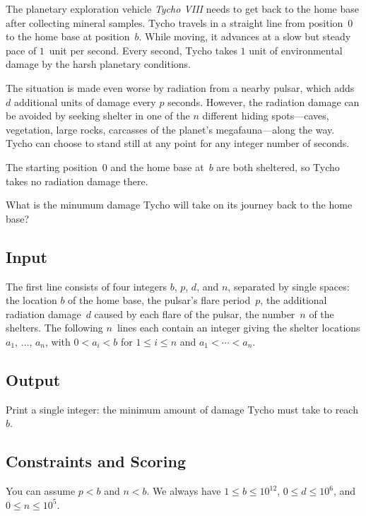 
The planetary exploration vehicle \emph{Tycho VIII} needs to get back to the home base after collecting mineral samples.
Tycho travels in a straight line from position~$0$ to the home base at position~$b$. While moving, it advances at a slow but steady pace of $1$~unit per second.
Every second, Tycho takes $1$ unit of environmental damage by the harsh planetary conditions.

The situation is made even worse by radiation from a nearby pulsar, which adds $d$ additional units of damage every $p$ seconds.
However, the radiation damage can be avoided by seeking shelter in one of the $n$ different hiding spots---caves, vegetation, large rocks, carcasses of the planet's megafauna---along the way.
Tycho can choose to stand still at any point for any integer number of seconds.

The starting position~$0$ and the home base at~$b$ are both sheltered, so Tycho takes no radiation damage there.

\medskip
What is the minumum damage Tycho will take on its journey back to the home base?

\subsection*{Input}

The first line consists of four integers $b$, $p$, $d$, and $n$, separated by single spaces:
the location $b$ of the home base,
the pulsar's flare period~$p$,
the additional radiation damage~$d$ caused by each flare of the pulsar,
the number~$n$ of the shelters.
The following $n$~lines each contain an integer giving the shelter locations $a_1$, $\ldots$, $a_n$, with 
$0<a_i< b$ for $1\leq i \leq n$ %
and 
$a_1<\cdots <a_n$. %

\subsection*{Output}

Print a single integer: the minimum amount of damage Tycho must take to reach $b$.

\subsection*{Constraints and Scoring}

You can assume
$p < b$ %
and
$n < b$. %
We always have
$1\leq b\leq 10^{12}$, %
$0\leq d \leq 10^6$, %
and
$0\leq n \leq 10^5$. %

